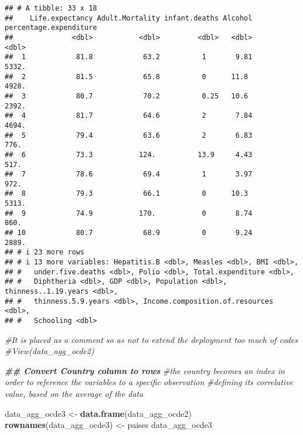 \documentclass[
]{article}
\newenvironment{Shaded}{\begin{snugshade}}{\end{snugshade}}
\newcommand{\CommentTok}[1]{\textcolor[rgb]{0.56,0.35,0.01}{\textit{#1}}}
\newcommand{\DocumentationTok}[1]{\textcolor[rgb]{0.56,0.35,0.01}{\textbf{\textit{#1}}}}
\newcommand{\FunctionTok}[1]{\textcolor[rgb]{0.13,0.29,0.53}{\textbf{#1}}}
\newcommand{\NormalTok}[1]{#1}
\newcommand{\OtherTok}[1]{\textcolor[rgb]{0.56,0.35,0.01}{#1}}
\begin{document}
\begin{verbatim}
## # A tibble: 33 x 18
##    Life.expectancy Adult.Mortality infant.deaths Alcohol percentage.expenditure
##              <dbl>           <dbl>         <dbl>   <dbl>                  <dbl>
##  1            81.8            63.2          1       9.81                  5332.
##  2            81.5            65.8          0      11.8                   4928.
##  3            80.7            70.2          0.25   10.6                   2392.
##  4            81.7            64.6          2       7.84                  4694.
##  5            79.4            63.6          2       6.83                   776.
##  6            73.3           124.          13.9     4.43                   517.
##  7            78.6            69.4          1       3.97                   972.
##  8            79.3            66.1          0      10.3                   5313.
##  9            74.9           170.           0       8.74                   860.
## 10            80.7            68.9          0       9.24                  2889.
## # i 23 more rows
## # i 13 more variables: Hepatitis.B <dbl>, Measles <dbl>, BMI <dbl>,
## #   under.five.deaths <dbl>, Polio <dbl>, Total.expenditure <dbl>,
## #   Diphtheria <dbl>, GDP <dbl>, Population <dbl>, thinness..1.19.years <dbl>,
## #   thinness.5.9.years <dbl>, Income.composition.of.resources <dbl>,
## #   Schooling <dbl>
\end{verbatim}

\begin{Shaded}
\begin{Highlighting}[]
\CommentTok{\#It is placed as a comment so as not to extend the deployment too much of codes}
\CommentTok{\#View(data\_agg\_ocde2)}

\DocumentationTok{\#\# Convert Country column to rows}
\CommentTok{\#the country becomes an index in order to reference the variables to a specific observation}
\CommentTok{\#defining its correlative value, based on the average of the data}

\NormalTok{data\_agg\_ocde3 }\OtherTok{\textless{}{-}} \FunctionTok{data.frame}\NormalTok{(data\_agg\_ocde2)}
\FunctionTok{rownames}\NormalTok{(data\_agg\_ocde3) }\OtherTok{\textless{}{-}}\NormalTok{ paises}
\NormalTok{data\_agg\_ocde3}
\end{Highlighting}
\end{Shaded}
\end{document}
